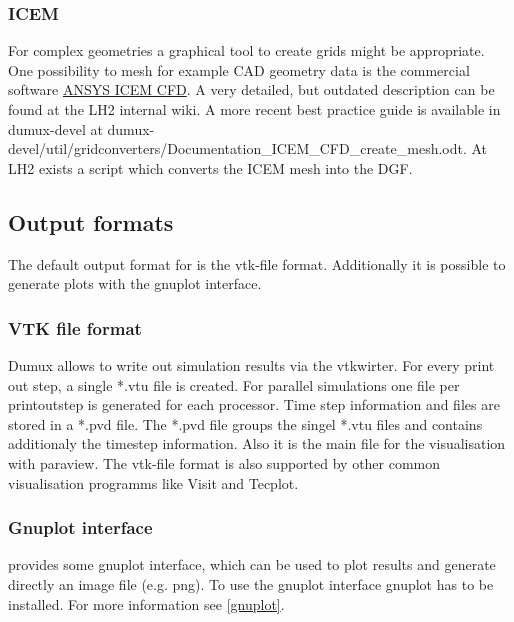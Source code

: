 \subsubsection{ICEM}
For complex geometries a graphical tool to create grids might be appropriate. One possibility to mesh for example CAD
geometry data is the commercial software \href{http://www.ansys.com/Products/Other+Products/ANSYS+ICEM+CFD/}{ANSYS ICEM
CFD}. A very detailed, but outdated description can be found at the LH2 internal wiki. A more recent best practice guide is available
in dumux-devel at dumux-devel/util/gridconverters/Documentation\_ICEM\_CFD\_create\_mesh.odt. At LH2 exists a script which converts the ICEM mesh into the DGF.


\subsection{Output formats}
The default output format for \Dumux is the vtk-file format. Additionally it is possible 
to generate plots with the gnuplot interface.

\subsubsection{VTK file format}
Dumux allows to write out simulation results via the vtkwirter.
For every print out step, a single *.vtu file is created. For parallel simulations one file
per printoutstep is generated for each processor. 
Time step information and files are stored in a *.pvd file.
The *.pvd file groups the singel *.vtu files and contains additionaly the timestep information.
Also it is the main file for the visualisation with paraview.
The vtk-file format is also supported by other common visualisation programms like Visit and Tecplot. 

\subsubsection{Gnuplot interface}
\Dumux provides some gnuplot interface, which can be used to plot results and generate directly an 
image file (e.g. png). To use the gnuplot interface gnuplot has to be installed. For more information see \ref{gnuplot}.

